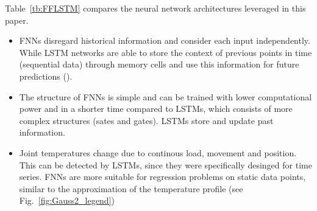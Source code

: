\documentclass{ifacconf}
\begin{document}
Table~\ref{tb:FFLSTM} compares the neural network architectures leveraged  in this paper.
\begin{table}[b!]
  \begin{center}
  \caption{Comparison of Feedforward and LSTM neural networks}\label{tb:FFLSTM}
  \end{center}
\end{table}
\begin{itemize}
  \item FNNs disregard historical information and consider each input independently. While LSTM networks are able to store the context of previous points in time (sequential data) through memory cells and use this information for future predictions (\cite{Liu}).
  \item The structure of FNNs is simple and can be trained with lower computational power and in a shorter time compared to LSTMs, which consists of more complex structures (sates and gates). LSTMs store and update past information.
  \item Joint temperatures change due to continous load, movement and position. This can be detected by LSTMs, since they were specifically desinged for time series. FNNs are more suitable for regression problems on static data points, similar to the approximation of the temperature profile (see Fig.~\ref{fig:Gauss2_legend})
\end{itemize}
\end{document}
